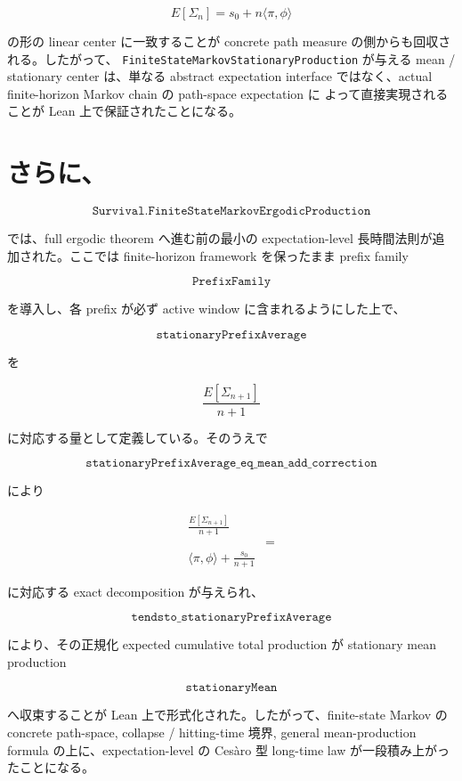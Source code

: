 \documentclass[12pt,a4paper]{article}
\begin{document}
\[
E[\Sigma_{n}] = s_0 + n\langle \pi,\phi\rangle
\]

の形の linear center に一致することが concrete path measure の側からも回収される。したがって、 \texttt{FiniteStateMarkovStationaryProduction} が与える mean / stationary center は、単なる abstract expectation interface ではなく、actual finite-horizon Markov chain の path-space expectation に よって直接実現されることが Lean 上で保証されたことになる。

\section{さらに、}\label{ux3055ux3089ux306b-5}

\[
\texttt{Survival.FiniteStateMarkovErgodicProduction}
\]

では、full ergodic theorem へ進む前の最小の expectation-level 長時間法則が追加された。ここでは finite-horizon framework を保ったまま prefix family

\[
\texttt{PrefixFamily}
\]

を導入し、各 prefix が必ず active window に含まれるようにした上で、

\[
\texttt{stationaryPrefixAverage}
\]

を

\[
\frac{E[\Sigma_{n+1}]}{n+1}
\]

に対応する量として定義している。そのうえで

\[
\texttt{stationaryPrefixAverage\_eq\_mean\_add\_correction}
\]

により

\[
\begin{aligned}
\frac{E[\Sigma_{n+1}]}{n+1} \\
&= \\
\langle \pi,\phi\rangle + \frac{s_0}{n+1}
\end{aligned}
\]

に対応する exact decomposition が与えられ、

\[
\texttt{tendsto\_stationaryPrefixAverage}
\]

により、その正規化 expected cumulative total production が stationary mean production

\[
\texttt{stationaryMean}
\]

へ収束することが Lean 上で形式化された。したがって、finite-state Markov の concrete path-space, collapse / hitting-time 境界, general mean-production formula の上に、expectation-level の Cesàro 型 long-time law が一段積み上がったことになる。
\end{document}
